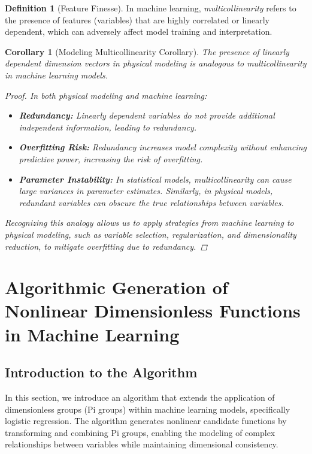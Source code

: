 \documentclass{article}
\newtheorem{corollary}{Corollary}[theorem]
\theoremstyle{definition}
\newtheorem{definition}{Definition}[section]
\theoremstyle{remark}
\begin{document}
	\begin{definition}[Feature Finesse]
		In machine learning, \emph{multicollinearity} refers to the presence of features (variables) that are highly correlated or linearly dependent, which can adversely affect model training and interpretation.
	\end{definition}
	
	\begin{corollary}[Modeling Multicollinearity Corollary]
		The presence of linearly dependent dimension vectors in physical modeling is analogous to multicollinearity in machine learning models.
		
		\begin{proof}
			In both physical modeling and machine learning:
			\begin{itemize}
				\item \textbf{Redundancy:} Linearly dependent variables do not provide additional independent information, leading to redundancy.
				\item \textbf{Overfitting Risk:} Redundancy increases model complexity without enhancing predictive power, increasing the risk of overfitting.
				\item \textbf{Parameter Instability:} In statistical models, multicollinearity can cause large variances in parameter estimates. Similarly, in physical models, redundant variables can obscure the true relationships between variables.
			\end{itemize}
			
			Recognizing this analogy allows us to apply strategies from machine learning to physical modeling, such as variable selection, regularization, and dimensionality reduction, to mitigate overfitting due to redundancy.
		\end{proof}
	\end{corollary}
	
	
\section{Algorithmic Generation of Nonlinear Dimensionless Functions in Machine Learning}

\subsection{Introduction to the Algorithm}

In this section, we introduce an algorithm that extends the application of dimensionless groups (Pi groups) within machine learning models, specifically logistic regression. The algorithm generates nonlinear candidate functions by transforming and combining Pi groups, enabling the modeling of complex relationships between variables while maintaining dimensional consistency.
\end{document}
